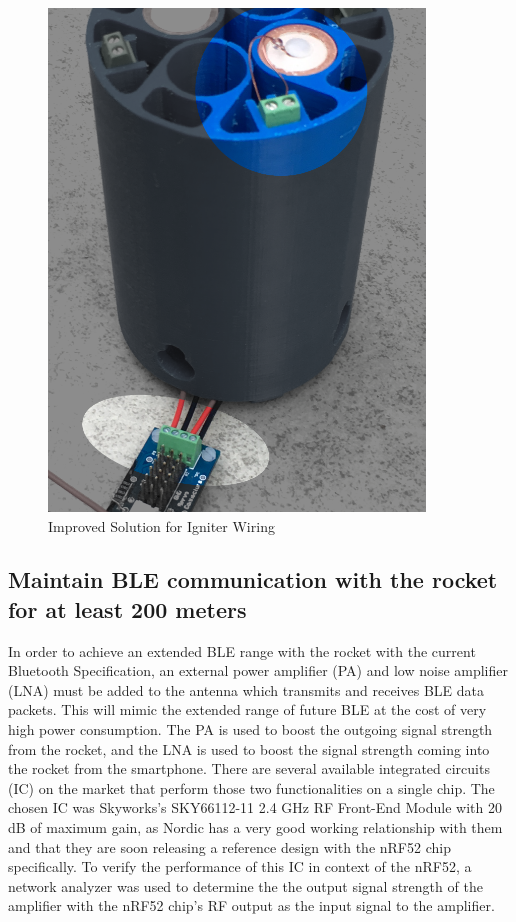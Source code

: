 \documentclass{workreport}
\begin{document}
\begin{body}
	\begin{figure}[!ht]
		\centering
		\includegraphics[width=10cm]{./images/igniter_wiring.png}
		\caption{Improved Solution for Igniter Wiring}
		\label{fig:igniter_wiring}
	\end{figure}

	\subsection{Maintain BLE communication with the rocket for at least 200 meters}

	In order to achieve an extended BLE range with the rocket with the current Bluetooth Specification, an external power amplifier (PA) and low noise amplifier (LNA) must be added to the antenna which transmits and receives BLE data packets. This will mimic the extended range of future BLE at the cost of very high power consumption. The PA is used to boost the outgoing signal strength from the rocket, and the LNA is used to boost the signal strength coming into the rocket from the smartphone. There are several available integrated circuits (IC) on the market that perform those two functionalities on a single chip. The chosen IC was Skyworks's SKY66112-11 2.4 GHz RF Front-End Module with 20 dB of maximum gain, as Nordic has a very good working relationship with them and that they are soon releasing a reference design with the nRF52 chip specifically. To verify the performance of this IC in context of the nRF52, a network analyzer was used to determine the the output signal strength of the amplifier with the nRF52 chip's RF output as the input signal to the amplifier.


\end{body}
\end{document}
